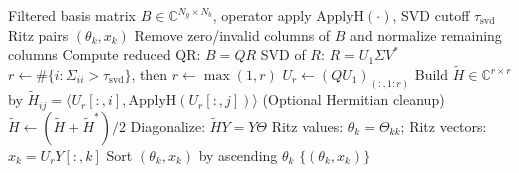 \begin{algorithm}[t]
\caption{SVD-accelerated Rayleigh--Ritz from filtered basis}
\label{alg:ritz}
\begin{algorithmic}[1]
\Require Filtered basis matrix $B\in\mathbb{C}^{N_g\times N_b}$, operator apply $\mathrm{ApplyH}(\cdot)$, SVD cutoff $\tau_{\mathrm{svd}}$
\Ensure Ritz pairs $(\theta_k, x_k)$
\State Remove zero/invalid columns of $B$ and normalize remaining columns
\State Compute reduced QR: $B=QR$
\State SVD of $R$: $R=U_1\Sigma V^\ast$
\State $r \gets \#\{i:\Sigma_{ii}>\tau_{\mathrm{svd}}\}$, then $r\gets \max(1,r)$
\State $U_r \gets (Q U_1)_{(:,1:r)}$
\State Build $\widetilde{H}\in\mathbb{C}^{r\times r}$ by
      $\widetilde{H}_{ij}=\langle U_r[:,i], \mathrm{ApplyH}(U_r[:,j])\rangle$
\State (Optional Hermitian cleanup) $\widetilde{H}\gets (\widetilde{H}+\widetilde{H}^\ast)/2$
\State Diagonalize: $\widetilde{H}Y=Y\Theta$
\State Ritz values: $\theta_k=\Theta_{kk}$; Ritz vectors: $x_k=U_rY[:,k]$
\State Sort $(\theta_k,x_k)$ by ascending $\theta_k$
\State \Return $\{(\theta_k,x_k)\}$
\end{algorithmic}
\end{algorithm}
